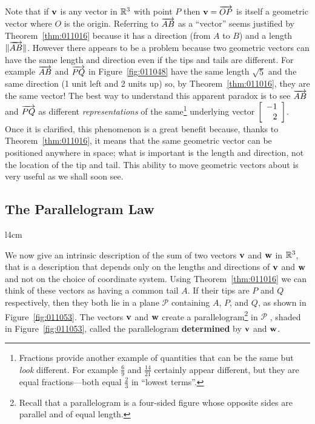 Note that if $\textbf{v}$ is any vector in $\mathbb{R}^3$ with point $P$ then $\textbf{v} = \overrightarrow{OP}$ is itself a geometric vector where $O$ is the origin. Referring to $\overrightarrow{AB}$  as a ``vector'' seems justified by Theorem~\ref{thm:011016} because it has a direction (from $A$ to $B$) and a length $\| \overrightarrow{AB} \|$. However there appears to be a problem because two geometric vectors can have the same length and direction even if the tips and tails are different. For example $\overrightarrow{AB}$ and $\overrightarrow{PQ}$ in Figure~\ref{fig:011048} have the same length $\sqrt{5}$ and the same direction (1 unit left and 2 units up) so, by Theorem~\ref{thm:011016}, they are the same vector! The best way to understand this apparent paradox is to see $\overrightarrow{AB}$ and $\overrightarrow{PQ}$ as different \textit{representations} of the same\footnote{Fractions provide another example of quantities that can be the same but \textit{look} different. For example $\frac{6}{9}$ and $\frac{14}{21}$
 certainly appear different, but they are equal fractions---both equal $\frac{2}{3}$ in ``lowest terms''.} underlying vector $\left[
 \begin{array}{r}
 -1 \\
 2  
 \end{array}
 \right]$. Once it is clarified, this phenomenon is a great benefit because, thanks to Theorem~\ref{thm:011016},
 it means that the same geometric vector can be positioned anywhere in 
space; what is important is the length and direction, not the location 
of the tip and tail. This ability to move geometric vectors about is 
very useful as we shall soon see.

\subsection*{The Parallelogram Law}

\begin{wrapfigure}[7]{l}{4cm} 
	\centering
	
	\caption{\label{fig:011053}}
\end{wrapfigure}

We now give an intrinsic description of the sum of two vectors $\textbf{v}$ and $\textbf{w}$ in $\mathbb{R}^3$, that is a description that depends only on the lengths and directions of $\textbf{v}$ and $\textbf{w}$ and not on the choice of coordinate system. Using Theorem~\ref{thm:011016} we can think of these vectors as having a common tail $A$. If their tips are $P$ and $Q$ respectively, then they both lie in a plane $\mathcal{P}$
 containing $A$, $P$, and $Q$, as shown in Figure~\ref{fig:011053}. The vectors $\textbf{v}$ and $\textbf{w}$ create a parallelogram\footnote{Recall that a parallelogram is a four-sided figure whose opposite sides are parallel and of equal length.}
 in $\mathcal{P}$
, shaded in Figure~\ref{fig:011053}, called the parallelogram \textbf{determined} by $\textbf{v}$ and $\textbf{w}$.

